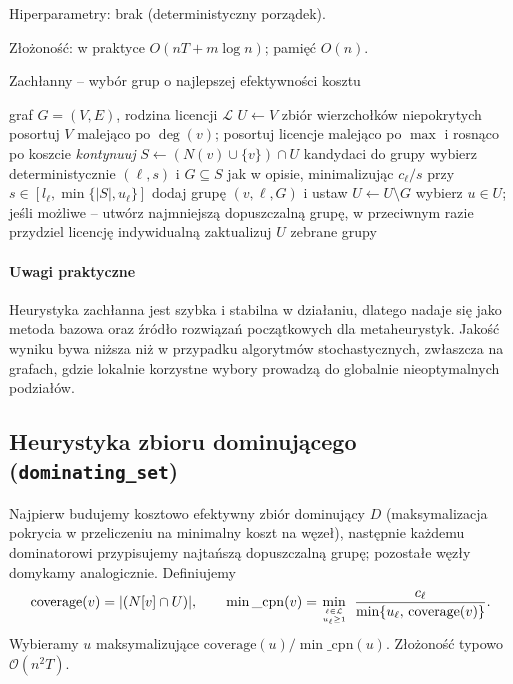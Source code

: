 Hiperparametry: brak (deterministyczny porządek).

Złożoność: w praktyce $O(nT + m\log n)$; pamięć $O(n)$.

\begin{algorithm}[H]
\caption{Zachłanny – wybór grup o najlepszej efektywności kosztu}
\label{alg:greedy}
\begin{algorithmic}[1]
\Require graf $G=(V,E)$, rodzina licencji $\mathcal{L}$
\State $U \gets V$ \Comment zbiór wierzchołków niepokrytych
\State posortuj $V$ malejąco po $\deg(v)$; posortuj licencje malejąco po $\max$ i rosnąco po koszcie
   \State \textit{kontynuuj} \EndIf
  \State $S \gets (N(v)\cup\{v\})\cap U$ \Comment kandydaci do grupy
  \State wybierz deterministycznie $(\ell,s)$ i $G\subseteq S$ jak w opisie, minimalizując $c_\ell/s$ przy $s\in[l_\ell,\min\{|S|,u_\ell\}]$
    \State dodaj grupę $(v,\ell,G)$ i ustaw $U\gets U\setminus G$
  \EndIf
\EndFor
{}
  \State wybierz $u\in U$; jeśli możliwe – utwórz najmniejszą dopuszczalną grupę, w przeciwnym razie przydziel licencję indywidualną
  \State zaktualizuj $U$
\EndWhile
\State \Return zebrane grupy
\end{algorithmic}
\end{algorithm}

\paragraph{Uwagi praktyczne}
Heurystyka zachłanna jest szybka i stabilna w działaniu, dlatego nadaje się jako metoda bazowa oraz źródło rozwiązań początkowych dla metaheurystyk. Jakość wyniku bywa niższa niż w przypadku algorytmów stochastycznych, zwłaszcza na grafach, gdzie lokalnie korzystne wybory prowadzą do globalnie nieoptymalnych podziałów.

\subsection{Heurystyka zbioru dominującego (\texttt{dominating\_set})}\label{subsec:ds}

Najpierw budujemy kosztowo efektywny zbiór dominujący $D$ (maksymalizacja pokrycia w przeliczeniu na minimalny koszt na węzeł), następnie każdemu dominatorowi przypisujemy najtańszą dopuszczalną grupę; pozostałe węzły domykamy analogicznie. Definiujemy
\[
\mathrm{coverage}(v)=|(N[v]\cap U)|,\qquad \min\_\mathrm{cpn}(v)=\min\limits_{\ell\in\mathcal{L}\atop u_\ell\ge 1}\ \frac{c_\ell}{\min\{u_\ell,\,\mathrm{coverage}(v)\}}.
\]
Wybieramy $u$ maksymalizujące $\mathrm{coverage}(u)/\min\_\mathrm{cpn}(u)$. Złożoność typowo $\mathcal{O}(n^2T)$.

